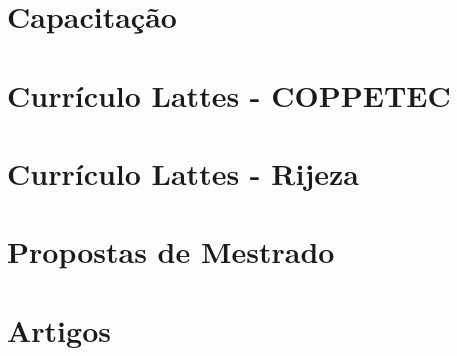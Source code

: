\documentclass[a4paper,10pt,oneside,brazilian,
draft=false]{report}%
\begin{document}
%
%


%


%


%




\chapter{Capacitação}


\chapter{Currículo Lattes - COPPETEC}








\chapter{Currículo Lattes - Rijeza}









\chapter{Propostas de Mestrado}
\label{app::propostas}





\label{app:artigos}
\chapter{Artigos}


\end{document}
